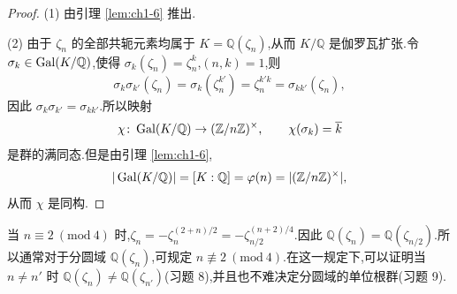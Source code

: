 \begin{proof}
(1) 由引理 \ref{lem:ch1-6} 推出.

(2) 由于 $\zeta_n$ 的全部共轭元素均属于 $K=\mathbb{Q}(\zeta_n)$,从而 $K/\mathbb{Q}$ 是伽罗瓦扩张.令 $\sigma_k\in\operatorname{Gal}(K/\mathbb{Q})$,使得 $\sigma_k(\zeta_n)=\zeta_n^k$,$(n,k)=1$,则
\[
  \sigma_k\sigma_{k'}(\zeta_n)=\sigma_k(\zeta_n^{k'})=\zeta_n^{k'k}=\sigma_{kk'}(\zeta_n),
\]
因此 $\sigma_k\sigma_{k'}=\sigma_{kk'}$.所以映射
\[
  \chi\colon\operatorname{Gal}(K/\mathbb{Q})\to(\mathbb{Z}/n\mathbb{Z})^\times,\qquad
  \chi(\sigma_k)=\overline{k}
\]
是群的满同态.但是由引理 \ref{lem:ch1-6},
\[
  |\operatorname{Gal}(K/\mathbb{Q})|=[K:\mathbb{Q}]=\varphi(n)=|(\mathbb{Z}/n\mathbb{Z})^\times|,
\]
从而 $\chi$ 是同构.
\end{proof}

当 $n\equiv 2\ (\mathrm{mod}\ 4)$ 时,$\zeta_n=-\zeta_n^{(2+n)/2}=-\zeta_{n/2}^{(n+2)/4}$.因此 $\mathbb{Q}(\zeta_n)=\mathbb{Q}(\zeta_{n/2})$.所以通常对于分圆域 $\mathbb{Q}(\zeta_n)$,可规定 $n\not\equiv 2\ (\mathrm{mod}\ 4)$.在这一规定下,可以证明当 $n\neq n'$ 时 $\mathbb{Q}(\zeta_n)\neq\mathbb{Q}(\zeta_{n'})$(习题 8),并且也不难决定分圆域的单位根群(习题 9).

